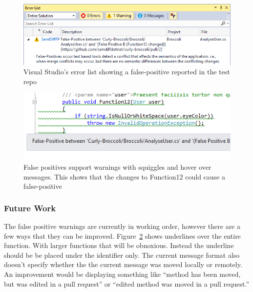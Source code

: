 \documentclass[draftclsnofoot,onecolumn]{IEEEtran}
\begin{document}
\begin{figure}[!t]
\centering
\includegraphics[scale=1]{FalsePositiveErrorList}

\caption{Visual Studio’s error list showing a false-positive reported in the 
test repo}
\label{fperrorlist}
\end{figure}

\begin{figure}[!t]
\centering
\includegraphics[scale=1]{FalsePositiveHoverOver}

\caption{False positives support warnings with squiggles and hover over 
messages. This shows that the changes to Function12 could cause a 
false-positive}
\label{fphoverover}
\end{figure}

\subsubsection{Future Work}

The false positive warnings are currently in working order, however there are 
a few ways that they can be improved. Figure~\ref{fphoverover} shows 
underlines over the entire function. With larger functions that will be 
obnoxious. Instead the underline should be be placed under the identifier 
only. The current message format also doesn’t specify whether the the current 
message was moved locally or remotely. An improvement would be displaying 
something like “method has been moved, but was edited in a pull request” or 
“edited method was moved in a pull request.”
\end{document}
